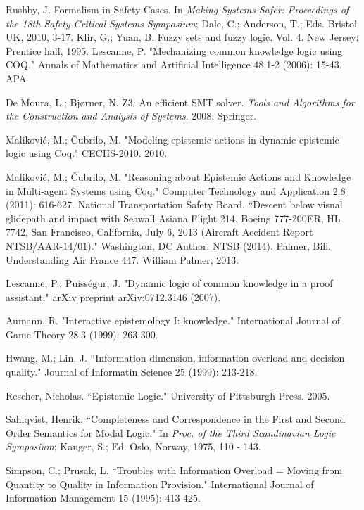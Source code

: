 \begin{thebibliography}{9}
	 	Rushby, J. Formalism in Safety Cases. In {\em Making Systems Safer: Proceedings of the 18th Safety-Critical Systems Symposium}; Dale, C.; Anderson, T.; Eds. Bristol UK, 2010, 3-17.
	 	Klir, G.; Yuan, B. Fuzzy sets and fuzzy logic. Vol. 4. New Jersey: Prentice hall, 1995.
	 	Lescanne, P. "Mechanizing common knowledge logic using COQ." Annals of Mathematics and Artificial Intelligence 48.1-2 (2006): 15-43.
	 	APA	
	 	
 		 De Moura, L.; Bj{\o}rner, N. Z3: An efficient SMT solver. \emph{Tools and Algorithms for the Construction and Analysis of Systems}. 2008. Springer.
	 	
	 	Malikovi\'c, M.; \v Cubrilo, M. "Modeling epistemic actions in dynamic epistemic logic using Coq." CECIIS-2010. 2010.
	 	
	 	Malikovi\'c, M.; \v Cubrilo, M. "Reasoning about Epistemic Actions and Knowledge in Multi-agent Systems using Coq." Computer Technology and Application 2.8 (2011): 616-627.
	 	National Transportation Safety Board. ``Descent below visual glidepath and impact with Seawall Asiana Flight 214, Boeing 777-200ER, HL 7742, San Francisco, California, July 6, 2013 (Aircraft Accident Report NTSB/AAR-14/01)." Washington, DC Author: NTSB (2014).
	 	Palmer, Bill. Understanding Air France 447. William Palmer, 2013.
	 	
	 	Lescanne, P.; Puiss\'egur, J. "Dynamic logic of common knowledge in a proof assistant." arXiv preprint arXiv:0712.3146 (2007).
	 	
	 	Aumann, R. "Interactive epistemology I: knowledge." International Journal of Game Theory 28.3 (1999): 263-300.
	 	
	 	Hwang, M.; Lin, J. ``Information dimension, information overload and decision quality." Journal of Informatin Science 25 (1999): 213-218.
	 	
	 	Rescher, Nicholas. ``Epistemic Logic." University of Pittsburgh Press. 2005.
	 	
	 	Sahlqvist, Henrik. ``Completeness and Correspondence in the First and Second Order Semantics for Modal Logic." In {\em Proc. of the Third Scandinavian Logic Symposium}; Kanger, S.; Ed. Oslo, Norway, 1975, 110 - 143.
	 	
	 	Simpson, C.; Prusak, L. ``Troubles with Information Overload = Moving from Quantity to Quality in Information Provision." International Journal of Information Management 15 (1995): 413-425.
	 	

\end{thebibliography}

